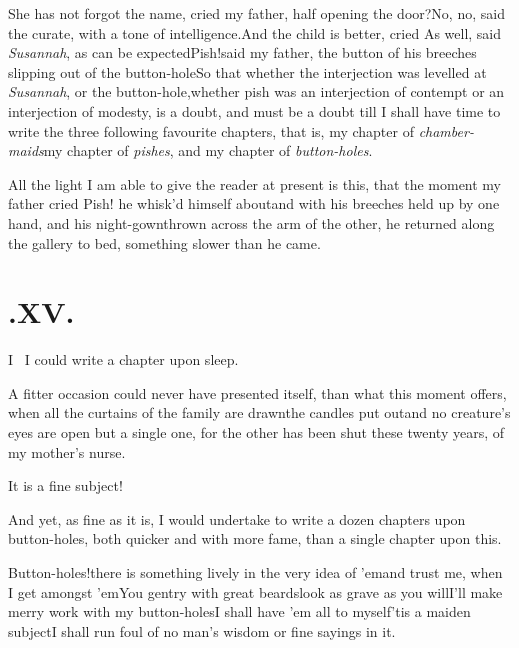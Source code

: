 \documentclass{article}
\begin{document}
\tsh She has not forgot the name, cried my father, half
opening the door?\tsk No,\pb
no, said the curate, with a tone of intelligence.\tsk And
the child is better, cried  As well, said \textit{Susannah}, as
can be expected\tsk Pish!\@ said my father, the button of his
breeches slipping out of the button-hole\tsk So that whether
the interjection was levelled at \textit{Susannah}, or the
button-hole,\tsk whether pish was an interjection of contempt
or an interjection of modesty, is a doubt, and must be a
doubt till I shall have time to write the three following
favourite chapters, that is, my chapter of
\textit{chamber-maids}\tsk my chapter of \textit{pishes},
and my chapter of \textit{button-holes}.

All the light I am able to give the reader at present is this,
that the moment my father cried Pish! he whisk’d himself
about\tsk and with his breeches held up by one hand, and his
night-gown\pb thrown across the arm of the other, he returned along the
gallery to bed, something slower than he came.

\medskip
\section{.\enspace XV.}

\lettrine{I}{\ } I could write a chapter upon\break
sleep.

A fitter occasion could never have presented itself, than what
this moment offers, when all the curtains of the family are
drawn\tsk the candles put out\tsk and no creature’s eyes
are open but a single one, for the other has been shut these twenty
years, of my mother’s nurse.

It is a fine subject!

\newpage
And yet, as fine as it is, I would undertake to write a dozen chapters upon
button-holes, both quicker and with\break
more fame, than a single
chapter upon this.

Button-holes!\tsh there is something lively in the very idea of ’em\tsk and trust me,
when I get amongst ’em\tsk You\break
gentry with great beards\tsh look as\break
grave as you will\tsh I’ll make merry\break
work with my button-holes\tsk I shall have
’em all to myself\tsk ’tis a maiden subject\break\tsk I shall run
foul of no man’s wisdom or fine sayings in it.
\end{document}
